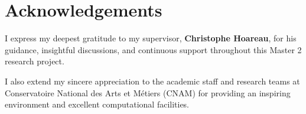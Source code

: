 \chapter*{Acknowledgements}

I express my deepest gratitude to my supervisor, \textbf{Christophe Hoareau}, for his guidance, insightful discussions, and continuous support throughout this Master 2 research project.

I also extend my sincere appreciation to the academic staff and research teams at Conservatoire National des Arts et Métiers (CNAM) for providing an inspiring environment and excellent computational facilities.
